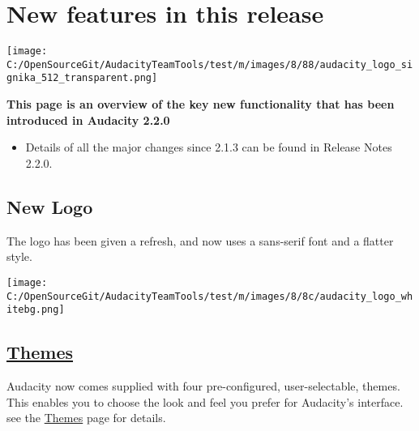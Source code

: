 \label{new_features_in_this_release_}
\chapter{New features in this release}\begin{multicols}{2}\par \texttt{[image: C:/OpenSourceGit/AudacityTeamTools/test/m/images/8/88/audacity\_logo\_signika\_512\_transparent.png]}\par \textbf{This page is an overview of the key new functionality that has been introduced in Audacity 2.2.0}
\begin{itemize}
\item Details of all the major changes since 2.1.3 can be found in Release Notes 2.2.0.
\end{itemize}

\label{new_features_in_this_release_logo}
\section{New Logo}The logo has been given a refresh, and now uses a sans-serif font and a flatter style.
\par \texttt{[image: C:/OpenSourceGit/AudacityTeamTools/test/m/images/8/8c/audacity\_logo\_whitebg.png]}\par 
\label{new_features_in_this_release_themes}
\section{
\hyperref[\foo{themes_}]{Themes}
}Audacity now comes supplied with four pre-configured, user-selectable, themes.  This enables you to choose the look and feel you prefer for Audacity's interface. see the 
\hyperref[\foo{themes_}]{Themes}
 page for details.


\end{multicols}
